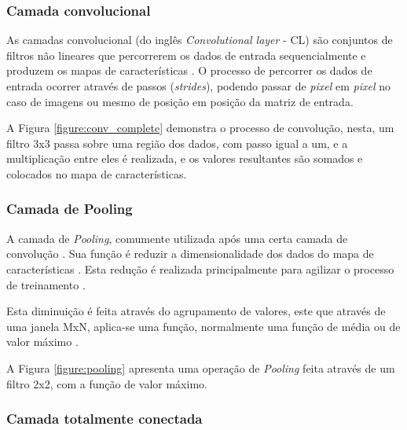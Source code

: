 \subsubsection{Camada convolucional}

As camadas convolucional (do inglês \textit{Convolutional layer} - CL) são conjuntos de filtros não lineares que percorrerem os dados de entrada sequencialmente e produzem os mapas de características \cite{Miyazaki2017}. O processo de percorrer os dados de entrada ocorrer através de passos (\textit{strides}), podendo passar de \textit{pixel} em \textit{pixel} no caso de imagens ou mesmo de posição em posição da matriz de entrada.

A Figura \ref{figure:conv_complete} demonstra o processo de convolução, nesta, um filtro 3x3 passa sobre uma região dos dados, com passo igual a um, e a multiplicação entre eles é realizada, e os valores resultantes são somados e colocados no mapa de características.


\subsubsection{Camada de Pooling}

A camada de \textit{Pooling}, comumente utilizada após uma certa camada de convolução \cite{Caroline2016}. Sua função é reduzir a dimensionalidade dos dados do mapa de características \cite{Caroline2016}. Esta redução é realizada principalmente para agilizar o processo de treinamento \cite{Caroline2016}.

Esta diminuição é feita através do agrupamento de valores, este que através de uma janela MxN, aplica-se uma função, normalmente uma função de média ou de valor máximo \cite{Amidi2018}.

A Figura \ref{figure:pooling} apresenta uma operação de \textit{Pooling} feita através de um filtro 2x2, com a função de valor máximo.


\subsubsection{Camada totalmente conectada}

